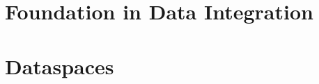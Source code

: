 \documentclass[a4paper,12pt,titlepage, openany, openright, cleardoubleempty]{scrreprt} %
\begin{document}
\graphicspath{{pics/}}

\pagestyle{empty}




\pagestyle{fancy}



\tableofcontents

\cleardoublepage %

\listoftables
{}

\listoffigures
{}

\cleardoublepage
{}

%


\chapter{Foundation in Data Integration}

\chapter{Dataspaces} \label{chapter_dataspaces}


%
%
%
%

\end{document}
